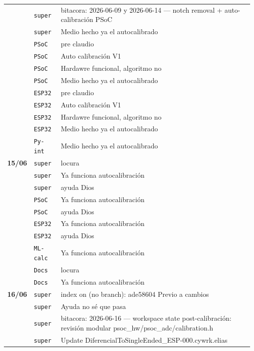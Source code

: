 \begin{longtable}{@{}p{1.7cm} p{1.5cm} p{12.2cm}@{}}
 & \texttt{\scriptsize super} & bitacora: 2026-06-09 y 2026-06-14 --- notch removal + auto-calibración PSoC \\
 & \texttt{\scriptsize super} & Medio hecho ya el autocalibrado \\
 & \texttt{\scriptsize PSoC} & pre claudio \\
 & \texttt{\scriptsize PSoC} & Auto calibración V1 \\
 & \texttt{\scriptsize PSoC} & Hardawre funcional, algoritmo no \\
 & \texttt{\scriptsize PSoC} & Medio hecho ya el autocalibrado \\
 & \texttt{\scriptsize ESP32} & pre claudio \\
 & \texttt{\scriptsize ESP32} & Auto calibración V1 \\
 & \texttt{\scriptsize ESP32} & Hardawre funcional, algoritmo no \\
 & \texttt{\scriptsize ESP32} & Medio hecho ya el autocalibrado \\
 & \texttt{\scriptsize Py-int} & Medio hecho ya el autocalibrado \\
\textbf{15/06} & \texttt{\scriptsize super} & locura \\
 & \texttt{\scriptsize super} & Ya funciona autocalibración \\
 & \texttt{\scriptsize super} & ayuda Dios \\
 & \texttt{\scriptsize PSoC} & Ya funciona autocalibración \\
 & \texttt{\scriptsize PSoC} & ayuda Dios \\
 & \texttt{\scriptsize ESP32} & Ya funciona autocalibración \\
 & \texttt{\scriptsize ESP32} & ayuda Dios \\
 & \texttt{\scriptsize ML-calc} & Ya funciona autocalibración \\
 & \texttt{\scriptsize Docs} & locura \\
 & \texttt{\scriptsize Docs} & Ya funciona autocalibración \\
\textbf{16/06} & \texttt{\scriptsize super} & index on (no branch): ade58604 Previo a cambios \\
 & \texttt{\scriptsize super} & Ayuda no sé que pasa \\
 & \texttt{\scriptsize super} & bitacora: 2026-06-16 --- workspace state post-calibración: revisión modular psoc\_hw/psoc\_adc/calibration.h \\
 & \texttt{\scriptsize super} & Update DiferencialToSingleEnded\_ESP-000.cywrk.elias \\

\end{longtable}
